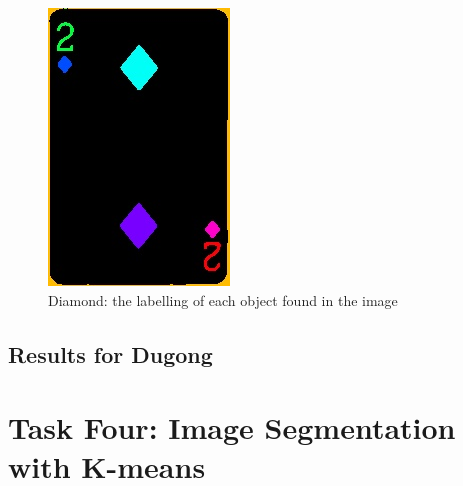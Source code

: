 \documentclass[conference]{IEEEtran}
\begin{document}
\begin{figure}[!htb]
\begin{minipage}[b]{0.45\textwidth}
    \includegraphics[width=\textwidth]{../programme/results/Task_3/diamond/image_1.jpg}
    \caption{Diamond: the labelling of each object found in the image}
    \label{Diamond: the labelling of each object found in the image}
  \end{minipage}
\end{figure}

\subsection{Results for Dugong}
\section{Task Four: Image Segmentation with K-means} \label{four}
\end{document}

